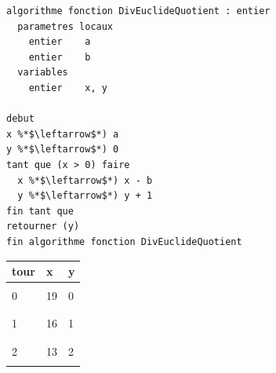 \documentclass[11pt,a4paper]{article}
\begin{document}
\begin{table}[h!]
  \centering
  \begin{minipage}{0.59\textwidth}
    \centering
\begin{lstlisting}[style=algorithmique]
algorithme fonction DivEuclideQuotient : entier
  parametres locaux
    entier    a
    entier    b
  variables
    entier    x, y

debut
x %*$\leftarrow$*) a
y %*$\leftarrow$*) 0
tant que (x > 0) faire
  x %*$\leftarrow$*) x - b
  y %*$\leftarrow$*) y + 1
fin tant que
retourner (y)
fin algorithme fonction DivEuclideQuotient \end{lstlisting}
  \end{minipage}
  \hfillx
  \begin{minipage}{0.4\textwidth}
    \centering
    \begin{tabular}{|C{1cm}|C{1cm}|C{1cm}|}
        \hline
        tour &  x &   y   \\
        \hline
             &    &       \\
        0    & 19 &   0   \\
             &    &       \\
        \hline
             &    &       \\
        1    & 16 &   1   \\
             &    &       \\
        \hline
             &    &       \\
        2    & 13 &   2   \\
             &    &       \\

\end{tabular}
\end{minipage}
\end{table}
\end{document}

